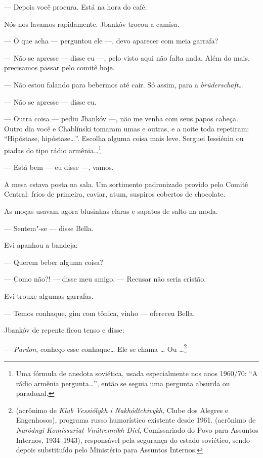 --- Depois você procura. Está na hora do café.

Nós nos lavamos rapidamente. Jbankóv trocou a camisa.

--- O que acha --- perguntou ele ---, devo aparecer
com meia garrafa?

--- Não se apresse --- disse eu ---, pelo visto
aqui não falta nada. Além do mais, precisamos passar pelo comitê hoje.

--- Não estou falando para bebermos até cair. Só assim, para a
\emph{brüderschaft}\ldots{}

--- Não se apresse --- disse eu.

--- Outra coisa --- pediu Jbankóv ---, não me venha
com seus papos cabeça. Outro dia você e Chablínski tomaram umas e
outras, e a noite toda repetiram: ``Hipóstase, hipóstase\ldots{}''. Escolha
alguma coisa mais leve. Serguei Iessiénin ou piadas do tipo rádio
armênia\ldots{}\footnote{Uma fórmula de anedota soviética, usada
  especialmente nos anos 1960/70: ``A rádio armênia pergunta\ldots{}'', então
  se seguia uma pergunta absurda ou paradoxal.}

--- Está bem --- eu disse ---, vamos.

A mesa estava posta na sala. Um sortimento padronizado provido pelo
Comitê Central: frios de primeira, caviar, atum, suspiros cobertos de
chocolate.

As moças usavam agora blusinhas claras e sapatos de salto na moda.

--- Sentem"-se --- disse Bella.

Evi apanhou a bandeja:

--- Querem beber alguma coisa?

--- Como não?! --- disse meu amigo. --- Recusar não
seria cristão.

Evi trouxe algumas garrafas.

--- Temos conhaque, gim com tônica, vinho --- ofereceu
Bella.

Jbankóv de repente ficou tenso e disse:

\emph{--- Pardon}, conheço esse conhaque\ldots{} Ele se chama \ldots{} Ou
\ldots{}\footnote{ (acrônimo de \emph{Klub Vessiólykh i
  Nakhódtchivykh}, Clube dos Alegres e Engenhosos), programa russo
  humorístico existente desde 1961.  (acrônimo de \emph{Naródnyi
  Komissariat Vnútrennikh Diel}, Comissariado do Povo para Assuntos
  Internos, 1934--1943), responsável pela segurança do estado soviético,
  sendo depois substituído pelo Ministério para Assuntos Internos.}


